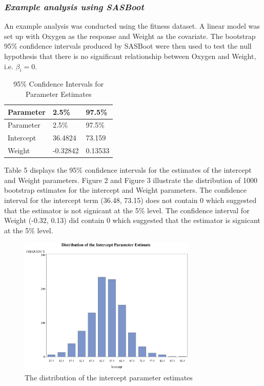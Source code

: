 \documentclass[]{article}
\begin{document}
\subsubsection{\texorpdfstring{\emph{Example analysis using
SASBoot}}{Example analysis using SASBoot}}\label{example-analysis-using-sasboot}

An example analysis was conducted using the fitness dataset. A linear
model was set up with Oxygen as the response and Weight as the
covariate. The bootstrap 95\% confidence intervals produced by SASBoot
were then used to test the null hypothesis that there is no significant
relationship between Oxygen and Weight, i.e. \(\beta_i = 0\).

\begin{longtable}[]{@{}lll@{}}
\caption{95\% Confidence Intervals for Parameter
Estimates}\tabularnewline
\toprule
Parameter & 2.5\% & 97.5\%\tabularnewline
\midrule
\endfirsthead
\toprule
Parameter & 2.5\% & 97.5\%\tabularnewline
\midrule
\endhead
Intercept & 36.4824 & 73.159\tabularnewline
Weight & -0.32842 & 0.13533\tabularnewline
\bottomrule
\end{longtable}

Table 5 displays the 95\% confidence intervals for the estimates of the
intercept and Weight parameters. Figure 2 and Figure 3 illustrate the
distribution of 1000 bootstrap estimates for the intercept and Weight
parameters. The confidence interval for the intercept term (36.48,
73.15) does not contain 0 which suggested that the estimator is not
signicant at the 5\% level. The confidence interval for Weight (-0.32,
0.13) did contain 0 which suggested that the estimator is signicant at
the 5\% level.

\begin{figure}
\centering
\includegraphics[width=0.75000\textwidth]{SAS Figures/SAS intercept distribution.png}
\caption{The distribution of the intercept parameter estimates}
\end{figure}
\end{document}
